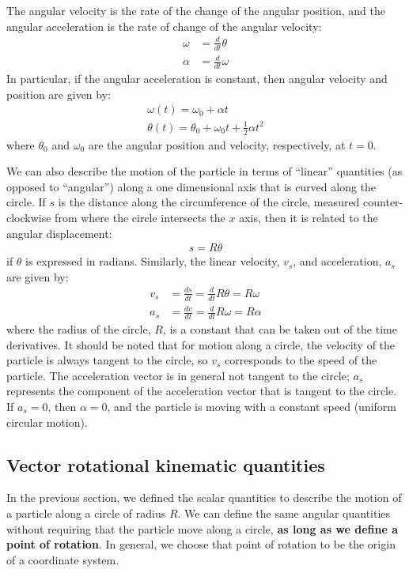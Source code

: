 The angular velocity is the rate of the change of the angular position, and the angular acceleration is the rate of change of the angular velocity:
\begin{align*}
\omega &= \frac{d}{dt}\theta \\
\alpha &= \frac{d}{dt}\omega
\end{align*}
In particular, if the angular acceleration is constant, then angular velocity and position are given by:
\begin{align*}
\omega(t) = \omega_0+\alpha t\\
\theta(t) = \theta_0+\omega_0 t+\frac{1}{2}\alpha t^2
\end{align*}
where $\theta_0$ and $\omega_0$ are the angular position and velocity, respectively, at $t=0$.

We can also describe the motion of the particle in terms of ``linear'' quantities (as opposed to ``angular'') along a one dimensional axis that is curved along the circle. If $s$ is the distance along the circumference of the circle, measured counter-clockwise from where the circle intersects the $x$ axis, then it is related to the angular displacement:
\begin{align*}
s = R\theta
\end{align*}
if $\theta$ is expressed in radians. Similarly, the linear velocity, $v_s$, and acceleration, $a_s$ are given by:
\begin{align*}
v_s &= \frac{ds}{dt} =\frac{d}{dt}R\theta = R\omega\\
a_s&= \frac{dv}{dt} =\frac{d}{dt}R\omega = R\alpha
\end{align*}
where the radius of the circle, $R$, is a constant that can be taken out of the time derivatives. It should be noted that for motion along a circle, the velocity of the particle is always tangent to the circle, so $v_s$ corresponds to the speed of the particle. The acceleration vector is in general not tangent to the circle; $a_s$ represents the component of the acceleration vector that is tangent to the circle. If $a_s=0$, then $\alpha=0$, and the particle is moving with a constant speed (uniform circular motion).
\subsection{Vector rotational kinematic quantities}
In the previous section, we defined the scalar quantities to describe the motion of a particle along a circle of radius $R$. We can define the same angular quantities without requiring that the particle move along a circle, \textbf{as long as we define a point of rotation}. In general, we choose that point of rotation to be the origin of a coordinate system. 

